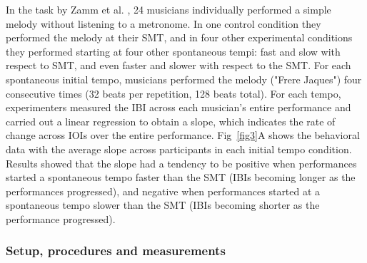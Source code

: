 \documentclass[10pt,letterpaper]{article}
\begin{document}
In the task by Zamm et al. \cite{zamm2018musicians}, 24 musicians individually performed a simple melody without listening to a metronome. In one control condition they performed the melody at their SMT, and in four other experimental conditions they performed starting at four other spontaneous tempi: fast and slow with respect to SMT, and even faster and slower with respect to the SMT. For each spontaneous initial tempo, musicians performed the melody ("Frere Jaques") four consecutive times (32 beats per repetition, 128 beats total). For each tempo, experimenters measured the IBI across each musician's entire performance and carried out a linear regression to obtain a slope, which indicates the rate of change across IOIs over the entire performance. Fig~\ref{fig3}A shows the behavioral data with the average slope across participants in each initial tempo condition. Results showed that the slope had a tendency to be positive when performances started a spontaneous tempo faster than the SMT (IBIs becoming longer as the performances progressed), and negative when performances started at a spontaneous tempo slower than the SMT (IBIs becoming shorter as the performance progressed).

\subsubsection*{Setup, procedures and measurements}
\end{document}
